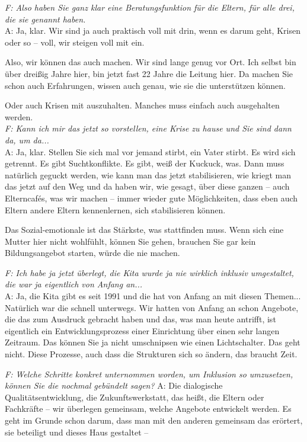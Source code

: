 \begin{linenumbers*}
\emph{F: Also haben Sie ganz klar eine Beratungsfunktion für die Eltern, für alle drei, die sie genannt haben.}\\
A: Ja, klar. Wir sind ja auch praktisch voll mit drin, wenn es darum geht, Krisen oder so -- voll, wir steigen voll mit ein. 

Also, wir können das auch machen. Wir sind lange genug vor Ort. Ich selbst bin über dreißig Jahre hier, bin jetzt fast 22 Jahre die Leitung hier. Da machen Sie schon auch Erfahrungen, wissen auch genau, wie sie die unterstützen können. 

Oder auch Krisen mit auszuhalten. Manches muss einfach auch ausgehalten werden.\\ 
\emph{F: Kann ich mir das jetzt so vorstellen, eine Krise zu hause und Sie sind dann da, um da...}\\
A: Ja, klar. Stellen Sie sich mal vor jemand stirbt, ein Vater stirbt. Es wird sich getrennt. Es gibt Suchtkonflikte. Es gibt, weiß der Kuckuck, was. Dann muss natürlich geguckt werden, wie kann man das jetzt stabilisieren, wie kriegt man das jetzt auf den Weg und da haben wir, wie gesagt, über diese ganzen -- auch Elterncafés, was wir machen -- immer wieder gute Möglichkeiten, dass eben auch Eltern andere Eltern kennenlernen, sich stabilisieren können. 

Das Sozial-emotionale ist das Stärkste, was stattfinden muss. Wenn sich eine Mutter hier nicht wohlfühlt, können Sie gehen, brauchen Sie gar kein Bildungsangebot starten, würde die nie machen.  

\emph{F: Ich habe ja jetzt überlegt, die Kita wurde ja nie wirklich inklusiv umgestaltet, die war ja eigentlich von Anfang an...}\\
A: Ja, die Kita gibt es seit 1991 und die hat von Anfang an mit diesen Themen... Natürlich war die schnell unterwegs. Wir hatten von Anfang an schon Angebote, die das zum Ausdruck gebracht haben und das, was man heute antrifft, ist eigentlich ein Entwicklungsprozess einer Einrichtung über einen sehr langen Zeitraum. Das können Sie ja nicht umschnipsen wie einen Lichtschalter. Das geht nicht. Diese Prozesse, auch dass die Strukturen sich so ändern, das braucht Zeit. 

\emph{F: Welche Schritte konkret unternommen worden, um Inklusion so umzusetzen, können Sie die nochmal gebündelt sagen?}
A: Die dialogische Qualitätsentwicklung, die Zukunftswerkstatt, das heißt, die Eltern oder Fachkräfte -- wir überlegen gemeinsam, welche Angebote entwickelt werden. Es geht im Grunde schon darum, dass man mit den anderen gemeinsam das erörtert, sie beteiligt und dieses Haus gestaltet --  


\end{linenumbers*}
